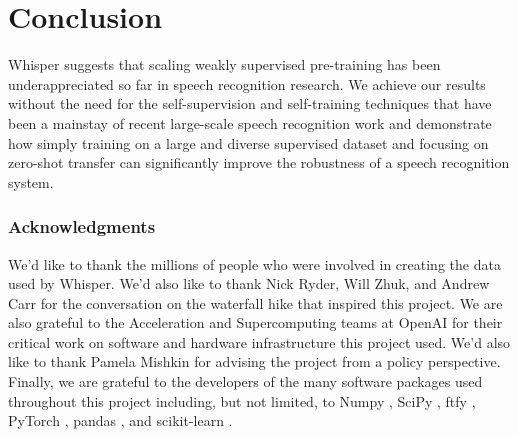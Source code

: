 \section{Conclusion}\label{sec:conclusion}

Whisper suggests that scaling weakly supervised pre-training has been underappreciated so far in speech recognition research. We achieve our results without the need for the self-supervision and self-training techniques that have been a mainstay of recent large-scale speech recognition work and demonstrate how simply training on a large and diverse supervised dataset and focusing on zero-shot transfer can significantly improve the robustness of a speech recognition system.

\subsubsection*{Acknowledgments}
We'd like to thank the millions of people who were involved in creating the data used by Whisper. We'd also like to thank Nick Ryder, Will Zhuk, and Andrew Carr for the conversation on the waterfall hike that inspired this project. We are also grateful to the Acceleration and Supercomputing teams at OpenAI for their critical work on software and hardware infrastructure this project used. We'd also like to thank Pamela Mishkin for advising the project from a policy perspective. Finally, we are grateful to the developers of the many software packages used throughout this project including, but not limited, to Numpy \citep{2020NumPy-Array}, SciPy \citep{2020SciPy-NMeth}, ftfy \citep{speer-2019-ftfy}, PyTorch \citep{NEURIPS2019_9015}, pandas \citep{reback2020pandas}, and scikit-learn \citep{scikit-learn}.

\newpage

